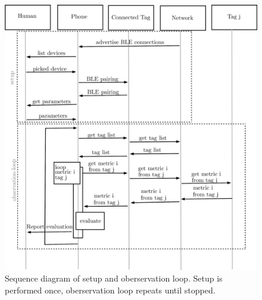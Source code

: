 \begin{figure}[ht!]
	\includegraphics[width=\linewidth]{graphics/schematics/obervation_loop.png}
	\caption{Sequence diagram of setup and oberservation loop. Setup is performed once, oberservation loop repeats until stopped.}
	\label{f:observation_loop}
\end{figure}

